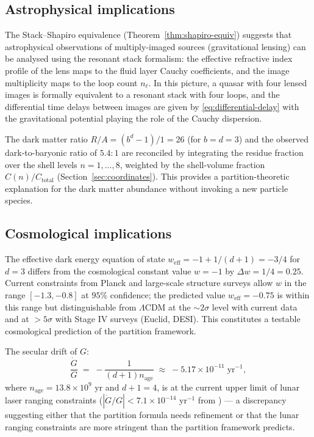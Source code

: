 \documentclass[11pt,twocolumn,a4paper]{article}
\theoremstyle{plain}
\theoremstyle{definition}
\theoremstyle{remark}
\begin{document}
\subsection{Astrophysical implications}

The Stack--Shapiro equivalence (Theorem~\ref{thm:shapiro-equiv}) suggests that astrophysical observations of multiply-imaged sources (gravitational lensing) can be analysed using the resonant stack formalism: the effective refractive index profile of the lens maps to the fluid layer Cauchy coefficients, and the image multiplicity maps to the loop count $n_\ell$. In this picture, a quasar with four lensed images is formally equivalent to a resonant stack with four loops, and the differential time delays between images are given by \eqref{eq:differential-delay} with the gravitational potential playing the role of the Cauchy dispersion.

The dark matter ratio $R/A=(b^d-1)/1=26$ (for $b=d=3$) and the observed dark-to-baryonic ratio of $5.4:1$ are reconciled by integrating the residue fraction over the shell levels $n=1,\ldots,8$, weighted by the shell-volume fraction $C(n)/C_\text{total}$ (Section~\ref{sec:coordinates}). This provides a partition-theoretic explanation for the dark matter abundance without invoking a new particle species.

\subsection{Cosmological implications}

The effective dark energy equation of state $w_\text{eff}=-1+1/(d+1)=-3/4$ for $d=3$ differs from the cosmological constant value $w=-1$ by $\Delta w=1/4=0.25$. Current constraints from Planck and large-scale structure surveys allow $w$ in the range $[-1.3,-0.8]$ at $95\%$ confidence; the predicted value $w_\text{eff}=-0.75$ is within this range but distinguishable from $\Lambda$CDM at the $\sim 2\sigma$ level with current data and at $>5\sigma$ with Stage IV surveys (Euclid, DESI). This constitutes a testable cosmological prediction of the partition framework.

The secular drift of $G$:
\begin{equation}
  \frac{\dot{G}}{G} \;=\; -\frac{1}{(d+1)n_\text{age}} \;\approx\; -5.17\times 10^{-11}\;\mathrm{yr}^{-1},
\end{equation}
where $n_\text{age}=13.8\times 10^9$ yr and $d+1=4$, is at the current upper limit of lunar laser ranging constraints ($|\dot{G}/G|<7.1\times 10^{-14}$ yr$^{-1}$ from \cite{LandauLifshitzED}) — a discrepancy suggesting either that the partition formula needs refinement or that the lunar ranging constraints are more stringent than the partition framework predicts.
\end{document}
